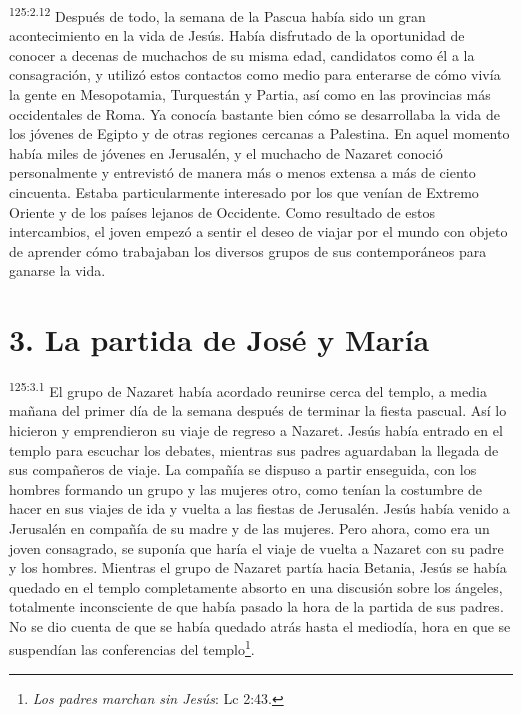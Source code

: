 \par
\textsuperscript{125:2.12} Después de todo, la semana de la Pascua había sido un gran acontecimiento en la vida de Jesús. Había disfrutado de la oportunidad de conocer a decenas de muchachos de su misma edad, candidatos como él a la consagración, y utilizó estos contactos como medio para enterarse de cómo vivía la gente en Mesopotamia, Turquestán y Partia, así como en las provincias más occidentales de Roma. Ya conocía bastante bien cómo se desarrollaba la vida de los jóvenes de Egipto y de otras regiones cercanas a Palestina. En aquel momento había miles de jóvenes en Jerusalén, y el muchacho de Nazaret conoció personalmente y entrevistó de manera más o menos extensa a más de ciento cincuenta. Estaba particularmente interesado por los que venían de Extremo Oriente y de los países lejanos de Occidente. Como resultado de estos intercambios, el joven empezó a sentir el deseo de viajar por el mundo con objeto de aprender cómo trabajaban los diversos grupos de sus contemporáneos para ganarse la vida.

\section*{3. La partida de José y María}
\par
\textsuperscript{125:3.1} El grupo de Nazaret había acordado reunirse cerca del templo, a media mañana del primer día de la semana después de terminar la fiesta pascual. Así lo hicieron y emprendieron su viaje de regreso a Nazaret. Jesús había entrado en el templo para escuchar los debates, mientras sus padres aguardaban la llegada de sus compañeros de viaje. La compañía se dispuso a partir enseguida, con los hombres formando un grupo y las mujeres otro, como tenían la costumbre de hacer en sus viajes de ida y vuelta a las fiestas de Jerusalén. Jesús había venido a Jerusalén en compañía de su madre y de las mujeres. Pero ahora, como era un joven consagrado, se suponía que haría el viaje de vuelta a Nazaret con su padre y los hombres. Mientras el grupo de Nazaret partía hacia Betania, Jesús se había quedado en el templo completamente absorto en una discusión sobre los ángeles, totalmente inconsciente de que había pasado la hora de la partida de sus padres. No se dio cuenta de que se había quedado atrás hasta el mediodía, hora en que se suspendían las conferencias del templo\footnote{\textit{Los padres marchan sin Jesús}: Lc 2:43.}.

